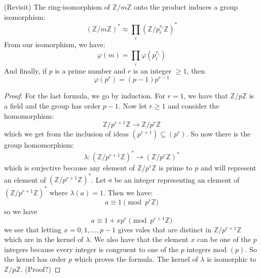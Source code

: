 \documentclass{report}
\begin{document}
(Revisit) The ring-isomorphism of $\mathbb{Z}/m\mathbb{Z}$ onto the product induces a group isomorphism:
    \begin{equation*}
        (\mathbb{Z}/m\mathbb{Z})^{*} \approx \prod_{i}^{} (\mathbb{Z}/p_{i}^{r_{i}}\mathbb{Z})^{*}
    \end{equation*}
From our isomorphism, we have:
    \begin{equation*}
        \varphi(m) = \prod_{i}^{} \varphi(p_{i}^{r_{i}})
    \end{equation*}
And finally, if $p$ is a prime number and $r$ is an integer $\geq 1$, then 
    \begin{equation*}
        \varphi(p^{r}) = (p - 1)p^{r - 1}
    \end{equation*}
    \begin{proof}
        For the last formula, we go by induction. For $r = 1$, we have that $\mathbb{Z}/p\mathbb{Z}$ is a field and the group has order $p - 1$. Now let $r \geq 1$ and consider the homomorphism:
            \begin{equation*}
                \mathbb{Z}/p^{r + 1}\mathbb{Z} \rightarrow \mathbb{Z}/p^{r}\mathbb{Z}
            \end{equation*}
        which we get from the inclusion of ideas $(p^{r + 1}) \subseteq (p^{r})$. So now there is the group homomorphism:
            \begin{equation*}
                \lambda : (\mathbb{Z}/p^{r + 1}\mathbb{Z})^{*} \rightarrow (\mathbb{Z}/p^{r}\mathbb{Z})^{*}
            \end{equation*}
        which is surjective because any element of $\mathbb{Z}/p^{r}\mathbb{Z}$ is prime to $p$ and will represent an element of $(\mathbb{Z}/p^{r + 1}\mathbb{Z})^{*}$. Let $a$ be an integer representing an element of $(\mathbb{Z}/p^{r + 1}\mathbb{Z})^{*}$ where $\lambda(a) = 1$. Then we have:
            \begin{equation*}
                a \equiv 1 \pmod{p^{r}\mathbb{Z}}
            \end{equation*}
        so we have 
            \begin{equation*}
                a \equiv 1 + xp^{r} \pmod{p^{r + 1}\mathbb{Z}}
            \end{equation*}
        we see that letting $x = 0, 1, \ldots, p - 1$ gives vales that are distinct in $\mathbb{Z}/p^{r + 1}\mathbb{Z}$ which are in the kernel of $\lambda$. We also have that the element $x$ can be one of the $p$ integers because every integer is congruent to one of the $p$ integers mod $(p)$. So the kernel has order $p$ which proves the formula. The kernel of $\lambda$ is isomorphic to $\mathbb{Z}/p\mathbb{Z}$. (Proof?)
    \end{proof}
\end{document}
